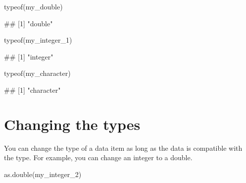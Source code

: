 \documentclass[
]{book}
\newenvironment{Shaded}{\begin{snugshade}}{\end{snugshade}}
\newcommand{\FunctionTok}[1]{\textcolor[rgb]{0.00,0.00,0.00}{#1}}
\newcommand{\NormalTok}[1]{#1}
\begin{document}
\begin{Shaded}
\begin{Highlighting}[]
\FunctionTok{typeof}\NormalTok{(my\_double)}
\end{Highlighting}
\end{Shaded}

\begin{Shaded}
\begin{Highlighting}[]
\NormalTok{\#\# [1] "double"}
\end{Highlighting}
\end{Shaded}

\begin{Shaded}
\begin{Highlighting}[]
\FunctionTok{typeof}\NormalTok{(my\_integer\_1)}
\end{Highlighting}
\end{Shaded}

\begin{Shaded}
\begin{Highlighting}[]
\NormalTok{\#\# [1] "integer"}
\end{Highlighting}
\end{Shaded}

\begin{Shaded}
\begin{Highlighting}[]
\FunctionTok{typeof}\NormalTok{(my\_character)}
\end{Highlighting}
\end{Shaded}

\begin{Shaded}
\begin{Highlighting}[]
\NormalTok{\#\# [1] "character"}
\end{Highlighting}
\end{Shaded}

\hypertarget{changing-the-types}{%
\section{Changing the types}\label{changing-the-types}}

You can change the type of a data item as long as the data is compatible with the type. For example, you can change an integer to a double.

\begin{Shaded}
\begin{Highlighting}[]
\FunctionTok{as.double}\NormalTok{(my\_integer\_2)}
\end{Highlighting}
\end{Shaded}
\end{document}
